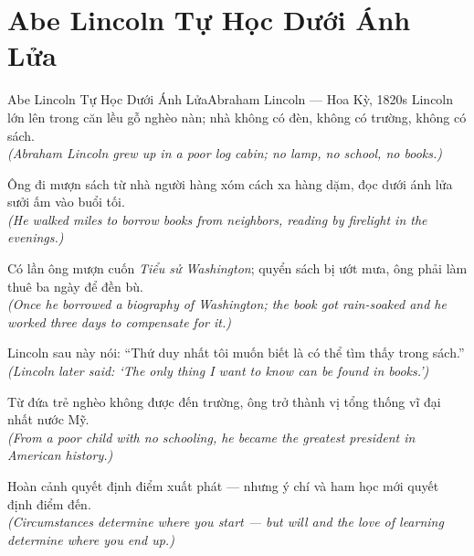 \section{Abe Lincoln Tự Học Dưới Ánh Lửa}
\begin{truyen}{Abe Lincoln Tự Học Dưới Ánh Lửa}{Abraham Lincoln --- Hoa Kỳ, 1820s}
 Lincoln lớn lên trong căn lều gỗ nghèo nàn; nhà không có đèn, không có trường, không có sách.\\[4pt]
\textit{(Abraham Lincoln grew up in a poor log cabin; no lamp, no school, no books.)}

Ông đi mượn sách từ nhà người hàng xóm cách xa hàng dặm, đọc dưới ánh lửa sưởi ấm vào buổi tối.\\[4pt]
\textit{(He walked miles to borrow books from neighbors, reading by firelight in the evenings.)}

Có lần ông mượn cuốn \textit{Tiểu sử Washington}; quyển sách bị ướt mưa, ông phải làm thuê ba ngày để đền bù.\\[4pt]
\textit{(Once he borrowed a biography of Washington; the book got rain-soaked and he worked three days to compensate for it.)}

Lincoln sau này nói: ``Thứ duy nhất tôi muốn biết là có thể tìm thấy trong sách.''\\[4pt]
\textit{(Lincoln later said: `The only thing I want to know can be found in books.')}

Từ đứa trẻ nghèo không được đến trường, ông trở thành vị tổng thống vĩ đại nhất nước Mỹ.\\[4pt]
\textit{(From a poor child with no schooling, he became the greatest president in American history.)}

\end{truyen}
\begin{baihoc}
  Hoàn cảnh quyết định điểm xuất phát --- nhưng ý chí và ham học mới quyết định điểm đến.\\[4pt]
  \textit{(Circumstances determine where you start --- but will and the love of learning determine where you end up.)}
\end{baihoc}

